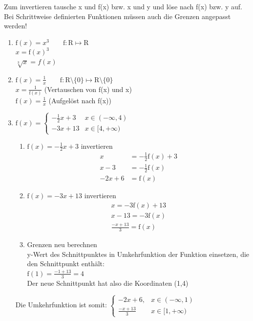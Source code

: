 \documentclass[11pt, a4paper]{article}
\begin{document}
Zum invertieren tausche x und f(x) bzw. x und y und löse nach f(x) bzw. y auf. Bei Schrittweise definierten Funktionen müssen auch die Grenzen angepasst werden!
\begin{enumerate}
	\item $\mathrm{f}(x) = x^3 \qquad \mathrm{f}: \mathrm{R} \mapsto \mathrm{R}$ \\
	$x = {\mathrm{f}(x)}^3$ \\
	$\sqrt[3]{x} = f(x)$
	\item $\mathrm{f}(x) = \frac{1}{x} \qquad \mathrm{f}: \mathrm{R} \setminus \{0\} \mapsto \mathrm{R} \setminus \{0\}$ \\
	$x = \frac{1}{\mathrm{f}(x)}$ (Vertauschen von f(x) und x)\\
	$\mathrm{f}(x) = \frac{1}{x}$ (Aufgelöst nach f(x))
	\item $\mathrm{f}(x) =
		\begin{cases}
			-\frac{1}{2}x + 3 & x \in (-\infty, 4) \\
			-3x + 13 & x \in [4, +\infty)
		\end{cases}
		$
		\begin{enumerate}
			\item $\mathrm{f}(x) = -\frac{1}{2}x + 3$ invertieren \\
				\begin{align*}
					x &= -\frac{1}{2}\mathrm{f}(x) + 3 \\
					x-3 &= -\frac{1}{2}\mathrm{f}(x) \\
					-2x+6 &= \mathrm{f}(x)
				\end{align*}
			\item $\mathrm{f}(x) = -3x + 13$ invertieren
			\begin{align*}
				x = -3 \mathrm{f}(x) + 13 \\
				x - 13 = -3 \mathrm{f}(x) \\
				\frac{-x + 13}{3} = \mathrm{f}(x)
			\end{align*}
			\item Grenzen neu berechnen \\
			y-Wert des Schnittpunktes in Umkehrfunktion der Funktion einsetzen, die den Schnittpunkt enthält: \\
			$\mathrm{f}(1) = \frac{-1 + 13}{3} = 4$ \\
			Der neue Schnittpunkt hat also die Koordinaten (1,4)
		\end{enumerate}
		Die Umkehrfunktion ist somit:
		$\begin{cases}
			-2x+6, & x \in (-\infty,1) \\
			\frac{-x + 13}{3} & x \in [1, +\infty)
		\end{cases}$
\end{enumerate}
\end{document}
